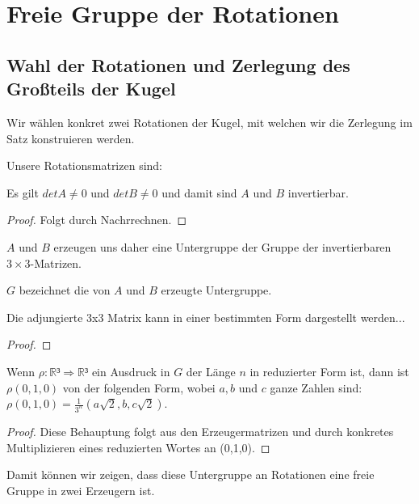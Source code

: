 \chapter{Freie Gruppe der Rotationen}


\section{Wahl der Rotationen und Zerlegung des Großteils der Kugel}




Wir wählen konkret zwei Rotationen der Kugel, mit welchen wir die Zerlegung im Satz konstruieren werden.
\begin{definition}\label{def:konk_rot}
\leanok {}
Unsere Rotationsmatrizen sind: 

\end{definition}

\begin{lemma} \label{lemma:a_b_invertierbar}
Es gilt $det A\neq 0$ und $det B\neq 0$ und damit sind $A$ und $B$ invertierbar.
\leanok
\end{lemma}
\begin{proof}  \leanok 
Folgt durch Nachrrechnen.
\end{proof}

$A$ und $B$ erzeugen uns daher eine Untergruppe der Gruppe der invertierbaren $3\times3$-Matrizen.
\begin{definition}\label{def:konk_rot_erzeugt} 
$G$ bezeichnet die von $A$ und $B$ erzeugte Untergruppe.
\leanok {}
\end{definition}


\begin{lemma}\label{lem:adjugate_fin_three}
    Die adjungierte 3x3 Matrix kann in einer bestimmten Form dargestellt werden...
     \leanok
    \end{lemma}
    \begin{proof}
    \leanok 
    \end{proof}

\begin{lemma}\label{lem:darst_von_rot_res}
\leanok
Wenn $\rho : \mathbb{R}³\Rightarrow\mathbb{R}³$ ein Ausdruck in $G$ der Länge 
$n$ in reduzierter Form ist, dann ist $\rho(0,1,0)$ von der folgenden Form, wobei
$a, b$ und $c$ ganze Zahlen sind: $\rho(0,1,0)=\frac{1}{3^n}(a\sqrt{2},b,c\sqrt{2})$.
\end{lemma}
\begin{proof} 
\leanok Diese Behauptung folgt aus den Erzeugermatrizen
und durch konkretes Multiplizieren eines reduzierten Wortes an (0,1,0).
\end{proof}
Damit können wir zeigen, dass diese Untergruppe an Rotationen eine freie Gruppe in zwei Erzeugern ist.


